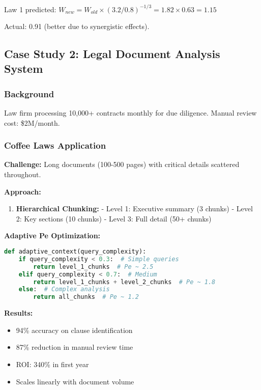 \documentclass[conference]{IEEEtran}
\begin{document}
Law 1 predicted: $W_{new} = W_{old} \times (3.2/0.8)^{-1/3} = 1.82 \times 0.63 = 1.15$

Actual: 0.91 (better due to synergistic effects).

\subsection{Case Study 2: Legal Document Analysis System}

\subsubsection{Background}

Law firm processing 10,000+ contracts monthly for due diligence. Manual review cost: \$2M/month.

\subsubsection{Coffee Laws Application}

\textbf{Challenge:} Long documents (100-500 pages) with critical details scattered throughout.

\textbf{Approach:}
\begin{enumerate}
\item \textbf{Hierarchical Chunking:}
   - Level 1: Executive summary (3 chunks)
   - Level 2: Key sections (10 chunks)
   - Level 3: Full detail (50+ chunks)
\end{enumerate}

\textbf{Adaptive Pe Optimization:}
\begin{lstlisting}[language=Python, basicstyle=\small]
def adaptive_context(query_complexity):
    if query_complexity < 0.3:  # Simple queries
        return level_1_chunks  # Pe ~ 2.5
    elif query_complexity < 0.7:  # Medium
        return level_1_chunks + level_2_chunks  # Pe ~ 1.8
    else:  # Complex analysis
        return all_chunks  # Pe ~ 1.2
\end{lstlisting}

\textbf{Results:}
\begin{itemize}
\item 94\% accuracy on clause identification
\item 87\% reduction in manual review time
\item ROI: 340\% in first year
\item Scales linearly with document volume
\end{itemize}
\end{document}
